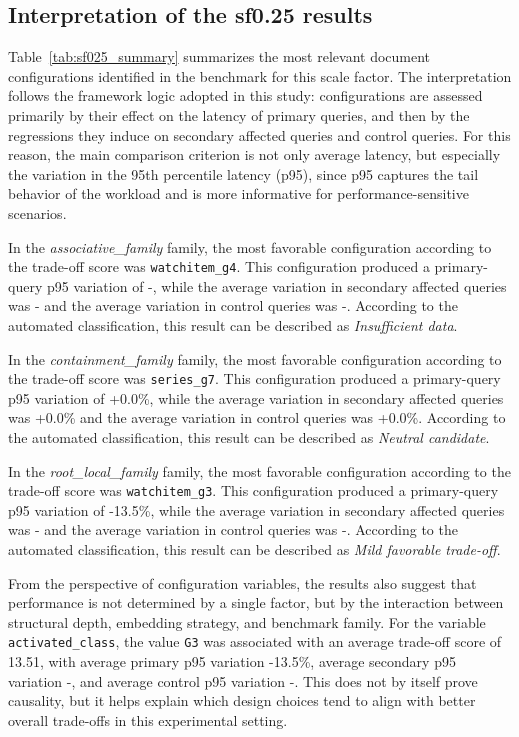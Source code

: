 \subsection{Interpretation of the sf0.25 results}

Table~\ref{tab:sf025_summary} summarizes the most relevant document configurations identified in the benchmark for this scale factor. 
The interpretation follows the framework logic adopted in this study: configurations are assessed primarily by their effect on the latency of primary queries, and then by the regressions they induce on secondary affected queries and control queries. 
For this reason, the main comparison criterion is not only average latency, but especially the variation in the 95th percentile latency (p95), since p95 captures the tail behavior of the workload and is more informative for performance-sensitive scenarios.

In the \textit{associative\_family} family, the most favorable configuration according to the trade-off score was \texttt{watchitem\_g4}. This configuration produced a primary-query p95 variation of -, while the average variation in secondary affected queries was - and the average variation in control queries was -. According to the automated classification, this result can be described as \textit{Insufficient data}.

In the \textit{containment\_family} family, the most favorable configuration according to the trade-off score was \texttt{series\_g7}. This configuration produced a primary-query p95 variation of +0.0\%, while the average variation in secondary affected queries was +0.0\% and the average variation in control queries was +0.0\%. According to the automated classification, this result can be described as \textit{Neutral candidate}.

In the \textit{root\_local\_family} family, the most favorable configuration according to the trade-off score was \texttt{watchitem\_g3}. This configuration produced a primary-query p95 variation of -13.5\%, while the average variation in secondary affected queries was - and the average variation in control queries was -. According to the automated classification, this result can be described as \textit{Mild favorable trade-off}.

From the perspective of configuration variables, the results also suggest that performance is not determined by a single factor, but by the interaction between structural depth, embedding strategy, and benchmark family. 
For the variable \texttt{activated\_class}, the value \texttt{G3} was associated with an average trade-off score of 13.51, with average primary p95 variation -13.5\%, average secondary p95 variation -, and average control p95 variation -. This does not by itself prove causality, but it helps explain which design choices tend to align with better overall trade-offs in this experimental setting.

